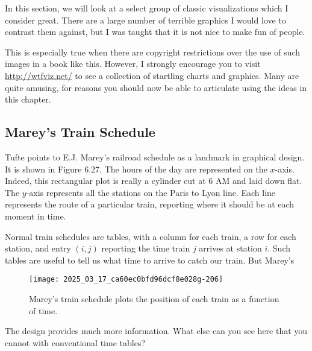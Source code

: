 \documentclass[10pt]{article}
\begin{document}
In this section, we will look at a select group of classic visualizations which I consider great. There are a large number of terrible graphics I would love to contrast them against, but I was taught that it is not nice to make fun of people.

This is especially true when there are copyright restrictions over the use of such images in a book like this. However, I strongly encourage you to visit \href{http://wtfviz.net/}{http://wtfviz.net/} to see a collection of startling charts and graphics. Many are quite amusing, for reasons you should now be able to articulate using the ideas in this chapter.

\subsection*{Marey's Train Schedule}
Tufte points to E.J. Marey's railroad schedule as a landmark in graphical design. It is shown in Figure 6.27. The hours of the day are represented on the $x$-axis. Indeed, this rectangular plot is really a cylinder cut at 6 AM and laid down flat. The $y$-axis represents all the stations on the Paris to Lyon line. Each line represents the route of a particular train, reporting where it should be at each moment in time.

Normal train schedules are tables, with a column for each train, a row for each station, and entry $(i, j)$ reporting the time train $j$ arrives at station $i$. Such tables are useful to tell us what time to arrive to catch our train. But Marey's


\begin{figure}[htbp]
    \centering
    \texttt{[image: 2025\_03\_17\_ca60ec0bfd96dcf8e028g-206]}
    \caption{Marey's train schedule plots the position of each train as a function of time.}
    \label{fig:marey_train_schedule}
\end{figure}

The design provides much more information. What else can you see here that you cannot with conventional time tables?
\end{document}

